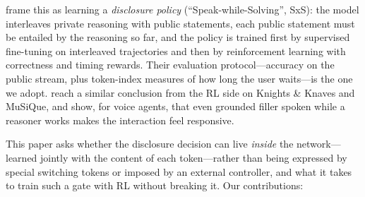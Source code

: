 \documentclass[letterpaper]{article} %
\begin{document}
\citet{wei2026sxs} frame this as learning a \emph{disclosure policy} (``Speak-while-Solving'', SxS): the model interleaves private reasoning with public statements, each public statement must be entailed by the reasoning so far, and the policy is trained first by supervised fine-tuning on interleaved trajectories and then by reinforcement learning with correctness and timing rewards. Their evaluation protocol---accuracy on the public stream, plus token-index measures of how long the user waits---is the one we adopt. \citet{xie2025interleaved} reach a similar conclusion from the RL side on Knights \& Knaves and MuSiQue, and \citet{srinivas2025convfill} show, for voice agents, that even grounded filler spoken while a reasoner works makes the interaction feel responsive.

This paper asks whether the disclosure decision can live \emph{inside} the network---learned jointly with the content of each token---rather than being expressed by special switching tokens or imposed by an external controller, and what it takes to train such a gate with RL without breaking it. Our contributions:
\end{document}
